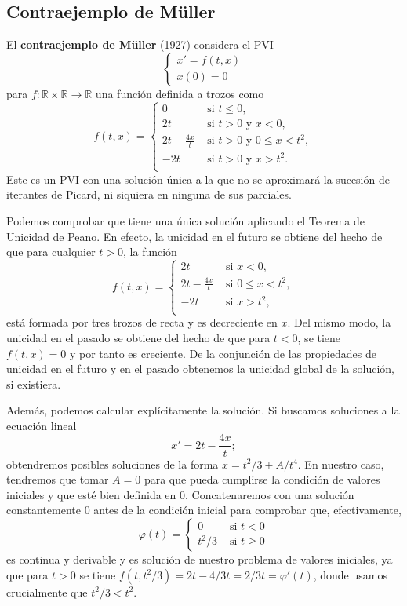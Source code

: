 \documentclass[11pt]{article}
\theoremstyle{plain}
\theoremstyle{definition}
\theoremstyle{remark}
\begin{document}
\subsection{Contraejemplo de Müller}

El \textbf{contraejemplo de Müller} (1927) considera el PVI
\[\left\{\begin{array}{l}
  x' = f(t,x) \\
  x(0) = 0
\end{array}\right.\]
para \(f \colon \mathbb{R} \times \mathbb{R} \to \mathbb{R}\) una función definida a trozos como
\[ f(t,x) = \left\{
    \begin{array}{ll}
      0 & \mbox{ si } t \leq 0, \\
      2t & \mbox{ si } t > 0 \mbox{ y } x < 0, \\
      2t - \frac{4x}{t} & \mbox{ si } t > 0 \mbox{ y } 0 \leq x < t^2, \\
      -2t & \mbox{ si } t > 0 \mbox{ y } x > t^2. \\
    \end{array}\right.\]
Este es un PVI con una solución única a la que no se aproximará
la sucesión de iterantes de Picard, ni siquiera en ninguna de sus
parciales.

Podemos comprobar que tiene una única solución aplicando el Teorema
de Unicidad de Peano. En efecto, la unicidad en el futuro se obtiene
del hecho de que para cualquier $t>0$, la función
\[ f(t,x) = \left\{
    \begin{array}{ll}
      2t & \mbox{ si } x < 0, \\
      2t - \frac{4x}{t} & \mbox{ si } 0 \leq x < t^2, \\
      -2t & \mbox{ si } x > t^2, \\
    \end{array}\right.\]
está formada por tres trozos de recta y es decreciente en $x$. Del
mismo modo, la unicidad en el pasado se obtiene del hecho de que
para $t < 0$, se tiene $f(t,x) = 0$ y por tanto es creciente. De
la conjunción de las propiedades de unicidad en el futuro y en el
pasado obtenemos la unicidad global de la solución, si existiera.

Además, podemos calcular explícitamente la solución. Si buscamos
soluciones a la ecuación lineal
\[
x' = 2t - \frac{4x}{t};
\]
obtendremos posibles soluciones de la forma $x = t^2/3 + A/t^4$. En
nuestro caso, tendremos que tomar $A = 0$ para que pueda cumplirse
la condición de valores iniciales y que esté bien definida en $0$.
Concatenaremos con una solución constantemente $0$ antes de la
condición inicial para comprobar que, efectivamente,
\[
  \varphi(t) = \left\{\begin{array}{ll}
      0 &\mbox{ si } t < 0 \\
      t^2/3 &\mbox{ si } t \geq 0   
  \end{array}\right.
\]
es continua y derivable y es solución de nuestro problema de
valores iniciales, ya que para $t > 0$ se tiene $f(t,t^2/3) = 2t - 4/3t = 2/3t = \varphi'(t)$,
donde usamos crucialmente que $t^2/3 < t^2$.
\end{document}
